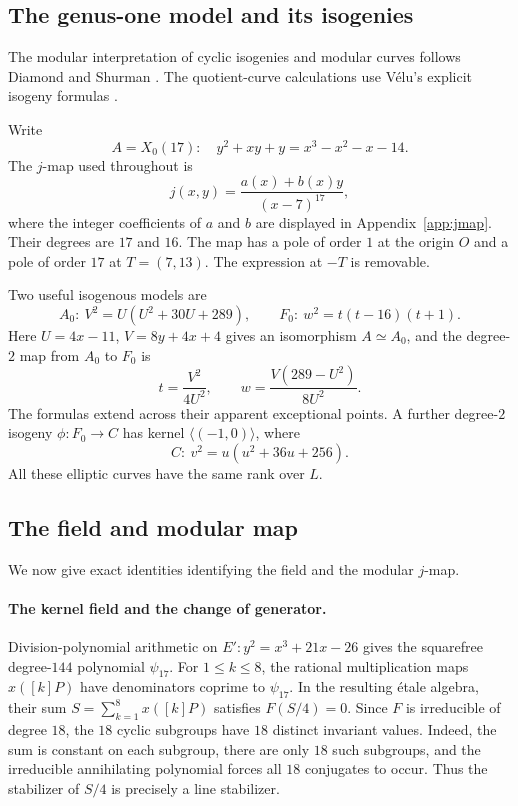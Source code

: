 \documentclass[11pt,a4paper]{article}
\theoremstyle{definition}\newtheorem{definition}[theorem]{Definition}
\theoremstyle{remark}\newtheorem{remark}[theorem]{Remark}
\begin{document}
\subsection{The genus-one model and its isogenies}

The modular interpretation of cyclic isogenies and modular curves follows Diamond and Shurman \cite{DS}. The quotient-curve calculations use V\'elu's explicit isogeny formulas \cite{Velu}.

Write
\begin{equation}\label{eq:A}
A=X_0(17):\quad y^2+xy+y=x^3-x^2-x-14.
\end{equation}
The $j$-map used throughout is
\begin{equation}\label{eq:jmap}
j(x,y)=\frac{a(x)+b(x)y}{(x-7)^{17}},
\end{equation}
where the integer coefficients of $a$ and $b$ are displayed in Appendix~\ref{app:jmap}. Their degrees are $17$ and $16$.
The map has a pole of order $1$ at the origin $O$ and a pole of order
$17$ at $T=(7,13)$. The expression at $-T$ is removable.

Two useful isogenous models are
\[
A_0:\ V^2=U(U^2+30U+289),\qquad
F_0:\ w^2=t(t-16)(t+1).
\]
Here $U=4x-11$, $V=8y+4x+4$ gives an isomorphism $A\simeq A_0$,
and the degree-$2$ map from $A_0$ to $F_0$ is
\[
t=\frac{V^2}{4U^2},\qquad
w=\frac{V(289-U^2)}{8U^2}.
\]
The formulas extend across their apparent exceptional points. A further
degree-$2$ isogeny $\phi:F_0\to C$ has kernel $\langle(-1,0)\rangle$,
where
\[
C:\ v^2=u(u^2+36u+256).
\]
All these elliptic curves have the same rank over $L$.


\subsection{The field and modular map}
\label{subsec:field-bridge-independent}

We now give exact identities identifying the field and the modular $j$-map.

\paragraph{The kernel field and the change of generator.}
Division-polynomial arithmetic on $E':y^2=x^3+21x-26$ gives the squarefree degree-$144$ polynomial $\psi_{17}$. For $1\leq k\leq8$, the rational multiplication maps $x([k]P)$ have denominators coprime to $\psi_{17}$. In the resulting \'etale algebra, their sum $S=\sum_{k=1}^{8}x([k]P)$ satisfies $F(S/4)=0$.
Since $F$ is irreducible of degree $18$, the $18$ cyclic subgroups have
$18$ distinct invariant values. Indeed, the sum is constant on each
subgroup, there are only $18$ such subgroups, and the irreducible
annihilating polynomial forces all $18$ conjugates to occur. Thus the
stabilizer of $S/4$ is precisely a line stabilizer.
\end{document}
